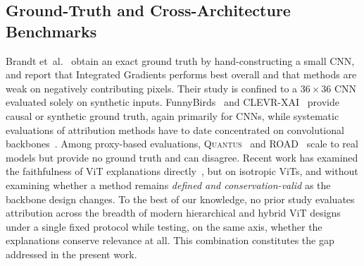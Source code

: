 \documentclass[lettersize,journal]{IEEEtran}
\theoremstyle{definition}
\theoremstyle{plain}
\begin{document}
\subsection{Ground-Truth and Cross-Architecture Benchmarks}
Brandt et~al.~\cite{brandt2023precise} obtain an exact ground truth by hand-constructing a small CNN, and report that Integrated Gradients performs best overall and that methods are weak on negatively contributing pixels. Their study is confined to a $36\times36$ CNN evaluated solely on synthetic inputs. FunnyBirds~\cite{hesse2023funnybirds} and CLEVR-XAI~\cite{arras2022clevrxai} provide causal or synthetic ground truth, again primarily for CNNs, while systematic evaluations of attribution methods have to date concentrated on convolutional backbones~\cite{rao2022attribution}. Among proxy-based evaluations, \textsc{Quantus}~\cite{hedstrom2023quantus} and ROAD~\cite{rong2022road} scale to real models but provide no ground truth and can disagree. Recent work has examined the faithfulness of ViT explanations directly~\cite{wu2024faithfulness}, but on isotropic ViTs, and without examining whether a method remains \emph{defined and conservation-valid} as the backbone design changes. To the best of our knowledge, no prior study evaluates attribution across the breadth of modern hierarchical and hybrid ViT designs under a single fixed protocol while testing, on the same axis, whether the explanations conserve relevance at all. This combination constitutes the gap addressed in the present work.
\end{document}
